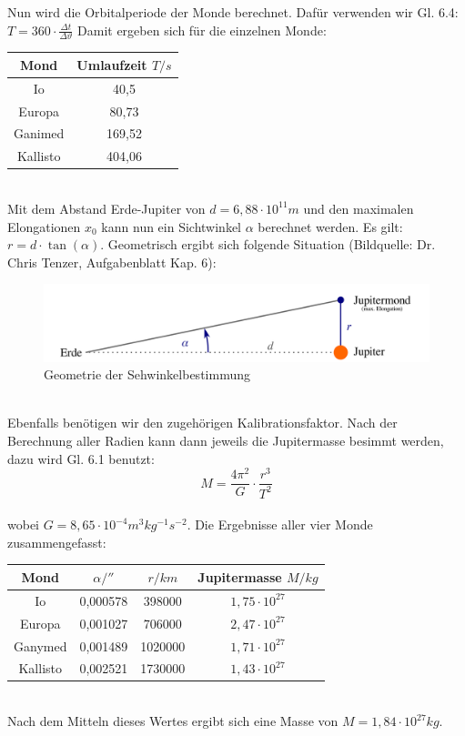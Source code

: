 \documentclass[12pt]{article}
\begin{document}
Nun wird die Orbitalperiode der Monde berechnet. Dafür verwenden wir Gl. 6.4: $\displaystyle T = 360 \cdot \frac{\Delta t}{\Delta  \vartheta}$
\newpage\noindent
Damit ergeben sich für die einzelnen Monde:
\begin{table}[!ht]
    \centering
    \begin{tabular}{c|c}
        Mond & Umlaufzeit $T /s$ \\ \hline
        Io & 40,5 \\ 
        Europa & 80,73 \\ 
        Ganimed & 169,52 \\ 
        Kallisto & 404,06 \\ 
    \end{tabular}
\end{table}\\
Mit dem Abstand Erde-Jupiter von $d = 6,88 \cdot 10^{11}m$ und den maximalen Elongationen $x_0$ kann nun ein Sichtwinkel $\alpha$ berechnet werden. Es gilt: $\displaystyle r = d \cdot \tan (\alpha)$. Geometrisch ergibt sich folgende Situation (Bildquelle: Dr. Chris Tenzer, Aufgabenblatt Kap. 6):\\
\begin{figure}[h!]
    \centering
    \includegraphics*[width=15cm]{sehwinkel.png}
    \caption[short]{Geometrie der Sehwinkelbestimmung}
\end{figure}\\
Ebenfalls benötigen wir den zugehörigen Kalibrationsfaktor. Nach der Berechnung aller Radien kann dann jeweils die Jupitermasse besimmt werden, dazu wird Gl. 6.1 benutzt:\\
\[M = \frac{4 \pi^2}{G} \cdot \frac{r^3}{T^2}\]\\
wobei $G= 8,65 \cdot 10^{-4}m^3kg^{-1}s^{-2}$. Die Ergebnisse aller vier Monde zusammengefasst:
\begin{table}[!ht]
    \centering
    \begin{tabular}{c|c|c|c}
        Mond & $\alpha / ''$ & $r /km$ & Jupitermasse $M /kg$ \\ \hline
        Io & 0,000578 & 398000 & $1,75 \cdot 10^{27}$\\
        Europa & 0,001027 & 706000 & $2,47 \cdot 10^{27}$\\ 
        Ganymed & 0,001489 & 1020000 & $1,71 \cdot 10^{27}$\\ 
        Kallisto & 0,002521 & 1730000 & $1,43 \cdot 10^{27}$ \\ 
    \end{tabular}
\end{table}\\
Nach dem Mitteln dieses Wertes ergibt sich eine Masse von $M=1,84 \cdot 10^{27}kg$.
\end{document}
